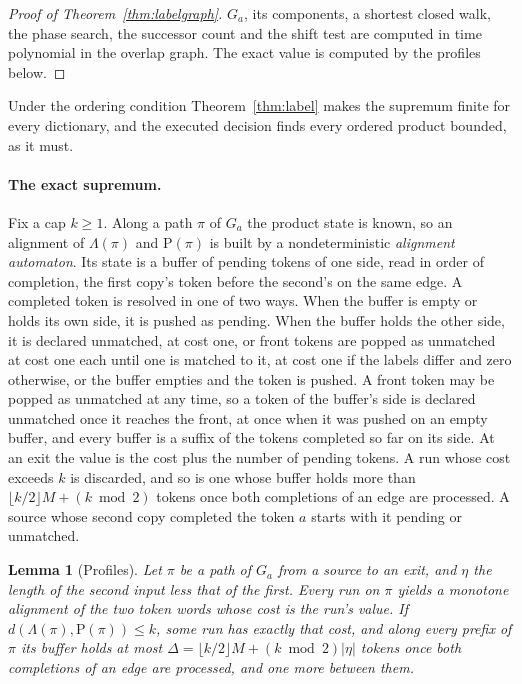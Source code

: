 \documentclass[11pt,a4paper]{article}
\theoremstyle{definition}
\theoremstyle{plain}
\newtheorem{lemma}{Lemma}
\begin{document}
\begin{proof}[Proof of Theorem~\ref{thm:labelgraph}]
\(G_a\), its components, a shortest closed walk, the phase search, the successor count and the shift test are computed
in time polynomial in the overlap graph. The exact value is computed by the profiles below.
\end{proof}

Under the ordering condition Theorem~\ref{thm:label} makes the supremum finite for every dictionary, and the executed
decision finds every ordered product bounded, as it must.

\paragraph{The exact supremum.} Fix a cap \(k \ge 1\). Along a path \(\pi\) of \(G_a\) the product state is known, so an
alignment of \(\Lambda(\pi)\) and \(\mathrm{P}(\pi)\) is built by a nondeterministic \emph{alignment automaton}. Its
state is a buffer of pending tokens of one side, read in order of completion, the first copy's token before the second's
on the same edge. A completed token is resolved in one of two ways. When the buffer is empty or holds its own side, it
is pushed as pending. When the buffer holds the other side, it is declared unmatched, at cost one, or front tokens are
popped as unmatched at cost one each until one is matched to it, at cost one if the labels differ and zero otherwise, or
the buffer empties and the token is pushed. A front token may be popped as unmatched at any time, so a token of the
buffer's side is declared unmatched once it reaches the front, at once when it was pushed on an empty buffer, and every
buffer is a suffix of the tokens completed so far on its side. At an exit the value is the cost plus the number of
pending tokens. A run whose cost exceeds \(k\) is discarded, and so is one whose buffer holds more than
\(\lfloor k/2 \rfloor M + (k \bmod 2)\) tokens once both completions of an edge are processed. A source whose second
copy completed the token \(a\) starts with it pending or unmatched.

\begin{lemma}[Profiles]\label{lem:profiles}
Let \(\pi\) be a path of \(G_a\) from a source to an exit, and \(\eta\) the length of the second input less that of the
first. Every run on \(\pi\) yields a monotone alignment of the two token words whose cost is the run's value. If
\(d(\Lambda(\pi), \mathrm{P}(\pi)) \le k\), some run has exactly that cost, and along every prefix of \(\pi\) its buffer
holds at most \(\Delta = \lfloor k/2 \rfloor M + (k \bmod 2)|\eta|\) tokens once both completions of an edge are
processed, and one more between them.
\end{lemma}
\end{document}
